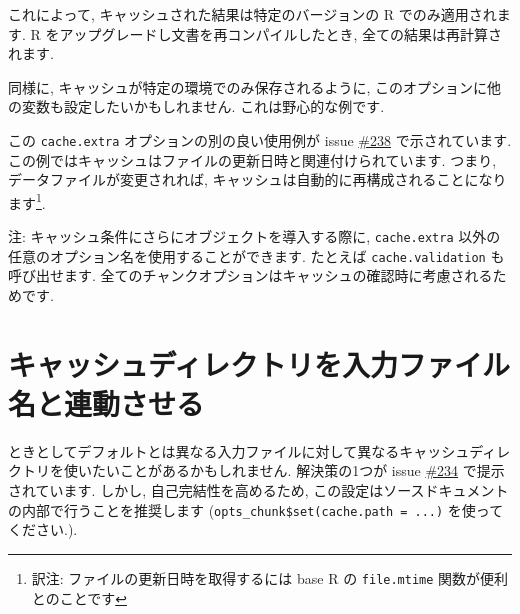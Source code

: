 \documentclass[
  lualatex,ja=standard,jafont=noto-otf]{bxjsreport}
\newenvironment{Shaded}{\begin{snugshade}}{\end{snugshade}}
\newcommand{\AttributeTok}[1]{\textcolor[rgb]{0.77,0.63,0.00}{#1}}
\newcommand{\DocumentationTok}[1]{\textcolor[rgb]{0.56,0.35,0.01}{\textbf{\textit{#1}}}}
\newcommand{\FunctionTok}[1]{\textcolor[rgb]{0.00,0.00,0.00}{#1}}
\newcommand{\NormalTok}[1]{#1}
\newcommand{\SpecialCharTok}[1]{\textcolor[rgb]{0.00,0.00,0.00}{#1}}
\newcommand{\StringTok}[1]{\textcolor[rgb]{0.31,0.60,0.02}{#1}}
\begin{document}
これによって, キャッシュされた結果は特定のバージョンの R
でのみ適用されます. R をアップグレードし文書を再コンパイルしたとき,
全ての結果は再計算されます.

同様に, キャッシュが特定の環境でのみ保存されるように,
このオプションに他の変数も設定したいかもしれません.
これは野心的な例です.

\begin{Shaded}
\end{Shaded}

この \texttt{cache.extra} オプションの別の良い使用例が issue
\href{https://github.com/yihui/knitr/issues/238}{\#238}
で示されています.
この例ではキャッシュはファイルの更新日時と関連付けられています. つまり,
データファイルが変更されれば,
キャッシュは自動的に再構成されることになります\footnote{訳注:
  ファイルの更新日時を取得するには base R の \texttt{file.mtime}
  関数が便利とのことです}.

注: キャッシュ条件にさらにオブジェクトを導入する際に,
\texttt{cache.extra} 以外の任意のオプション名を使用することができます.
たとえば \texttt{cache.validation} も呼び出せます.
全てのチャンクオプションはキャッシュの確認時に考慮されるためです.

\hypertarget{ux30adux30e3ux30c3ux30b7ux30e5ux30c7ux30a3ux30ecux30afux30c8ux30eaux3092ux5165ux529bux30d5ux30a1ux30a4ux30ebux540dux3068ux9023ux52d5ux3055ux305bux308b}{%
\section*{キャッシュディレクトリを入力ファイル名と連動させる}\label{ux30adux30e3ux30c3ux30b7ux30e5ux30c7ux30a3ux30ecux30afux30c8ux30eaux3092ux5165ux529bux30d5ux30a1ux30a4ux30ebux540dux3068ux9023ux52d5ux3055ux305bux308b}}

ときとしてデフォルトとは異なる入力ファイルに対して異なるキャッシュディレクトリを使いたいことがあるかもしれません.
解決策の1つが issue
\href{https://github.com/yihui/knitr/issues/234}{\#234}
で提示されています. しかし, 自己完結性を高めるため,
この設定はソースドキュメントの内部で行うことを推奨します
(\texttt{opts\_chunk\$set(cache.path\ =\ ...)} を使ってください.).
\end{document}

